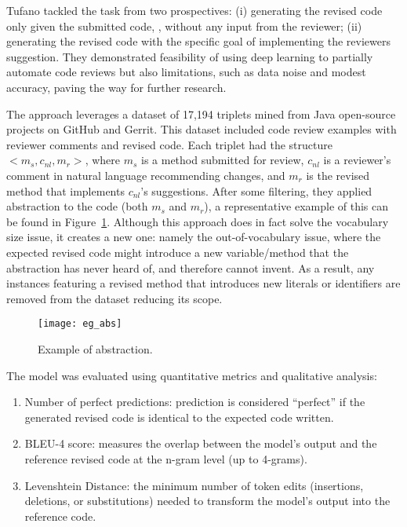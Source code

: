 Tufano \etal \cite{tufano:icse2021} tackled the task from two prospectives: (i)
generating the revised code only given the submitted code, \ie, without any
input from the reviewer; (ii) generating the revised code with the specific
goal of implementing the reviewers suggestion. They demonstrated feasibility of
using deep learning to partially automate code reviews but also limitations,
such as data noise and modest accuracy, paving the way for further research.

The approach leverages a dataset of 17,194 triplets mined from Java open-source
projects on GitHub and Gerrit. This dataset included code review examples with
reviewer comments and revised code. Each triplet had the structure $<m_s,
	c_{nl}, m_r>$, where $m_s$ is a method submitted for review, $c_{nl}$ is a
reviewer’s comment in natural language recommending changes, and $m_r$ is the
revised method that implements $c_{nl}$’s suggestions.
After some filtering, they applied abstraction to the code (both $m_s$ and
$m_r$), a representative example of this can be found in
Figure~\ref{fig:abstraction}. Although this approach does in fact solve the
vocabulary size issue, it creates a new one: namely the out-of-vocabulary
issue, where the expected revised code might introduce a new variable/method
that the abstraction has never heard of, and therefore cannot invent. As a
result, any instances featuring a revised method that introduces new literals
or identifiers are removed from the dataset reducing its scope.

\begin{figure}[ht]
	\centering
	\texttt{[image: eg\_abs]}
	\caption{Example of abstraction.}
	\label{fig:abstraction}
	\vspace{-0.1cm}
\end{figure}

The model was evaluated using quantitative metrics and qualitative analysis:
\begin{enumerate}
	\item Number of perfect predictions: prediction is considered ``perfect'' if the
	      generated revised code is identical to the expected code written.
	\item BLEU-4 score: measures the overlap between the model's output and the reference
	      revised code at the n-gram level (up to 4-grams).
	\item Levenshtein Distance: the minimum number of token edits (insertions, deletions,
	      or substitutions) needed to transform the model's output into the reference
	      code.
\end{enumerate}

